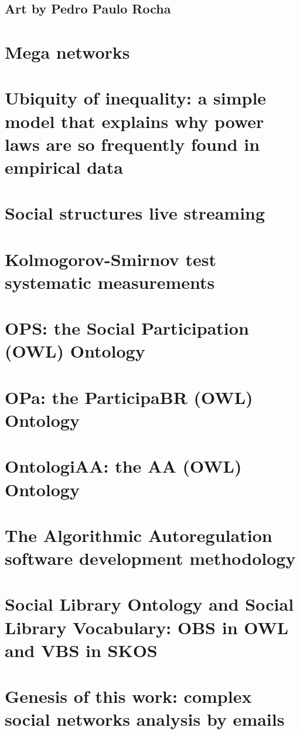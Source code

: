 \begin{apendicesenv}
	\subsection{Art by Pedro Paulo Rocha}
\section{Mega networks}
\section{Ubiquity of inequality: a simple model that explains why power laws are so frequently found in empirical data}
\section{Social structures live streaming}
\section{Kolmogorov-Smirnov test systematic measurements}
\section{OPS: the Social Participation (OWL) Ontology}
\section{OPa: the ParticipaBR (OWL) Ontology}
\section{OntologiAA: the AA (OWL) Ontology}
\section{The Algorithmic Autoregulation software development methodology}
\section{Social Library Ontology and Social Library Vocabulary: OBS in OWL and VBS in SKOS}
\section{Genesis of this work: complex social networks analysis by emails}

\end{apendicesenv}
